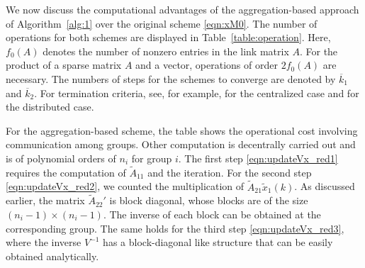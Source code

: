 \documentclass[11pt,draftcls,onecolumn]{IEEEtran}
\begin{document}
We now discuss the computational advantages of 
the aggregation-based approach of Algorithm~\ref{alg:1} over
the original scheme \eqref{eqn:xM0}. 
The number of operations for both schemes are displayed in 
Table~\ref{table:operation}.
Here, $f_{0}(A)$ denotes the number of nonzero entries
in the link matrix $A$. For the product of a sparse matrix $A$ and
a vector, operations of order $2f_{0}(A)$ are necessary.
The numbers of steps for the schemes to converge are denoted by
$\overline{k}_1$ and $\overline{k}_2$.
For termination criteria, see, for example, \cite{KamHavGol:04} for the centralized case 
and \cite{IshTem:10} for the distributed case. 

For the aggregation-based scheme, the table shows the operational cost
involving communication among groups. Other computation is decentrally 
carried out and is of polynomial orders of $n_i$ for group $i$.
The first step \eqref{eqn:updateVx_red1}
requires the computation of $\widetilde{A}_{11}$ and the iteration. 
For the second step \eqref{eqn:updateVx_red2}, 
we counted the multiplication of $\widetilde{A}_{21}\widetilde{x}_{1}(k)$.
As discussed earlier, 
the matrix $\widetilde{A}_{22}'$ is block diagonal, whose blocks
are of the size $(n_i-1)\times(n_i-1)$. The inverse of each block
can be obtained at the corresponding group. 
The same holds for the third step \eqref{eqn:updateVx_red3},
where the inverse $V^{-1}$ has a block-diagonal like structure
that can be easily obtained analytically.


\end{document}
